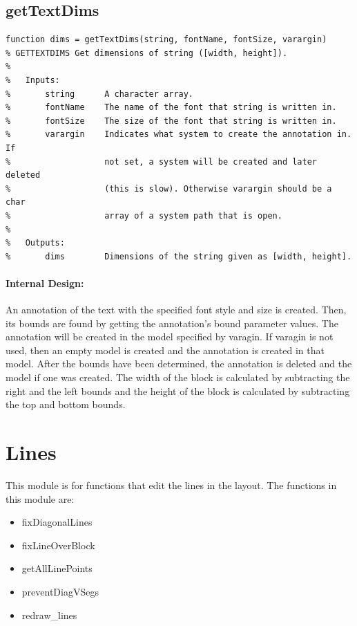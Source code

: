 \documentclass[12pt,letterpaper]{report}
\begin{document}
\subsection{getTextDims} \label{getTextDims}
\begin{lstlisting}
function dims = getTextDims(string, fontName, fontSize, varargin)
% GETTEXTDIMS Get dimensions of string ([width, height]).
%
%   Inputs:
%       string      A character array.
%       fontName    The name of the font that string is written in.
%       fontSize    The size of the font that string is written in.
%       varargin    Indicates what system to create the annotation in. If
%                   not set, a system will be created and later deleted
%                   (this is slow). Otherwise varargin should be a char
%                   array of a system path that is open.
%
%   Outputs:
%       dims        Dimensions of the string given as [width, height].
\end{lstlisting}
\paragraph{Internal Design:} An annotation of the text with the specified font style and size is created. Then, its bounds are found by getting the annotation's bound parameter values. The annotation will be created in the model specified by varagin. If varagin is not used, then an empty model is created and the annotation is created in that model. After the bounds have been determined, the annotation is deleted and the model if one was created. The width of the block is calculated by subtracting the right and the left bounds and the height of the block is calculated by subtracting the top and bottom bounds.

\section{Lines}
\par This module is for functions that edit the lines in the layout. The functions in this module are:
\begin{itemize}
	\item fixDiagonalLines
	\item fixLineOverBlock
	\item getAllLinePoints
	\item preventDiagVSegs
	\item redraw\_lines
\end{itemize}
\end{document}
